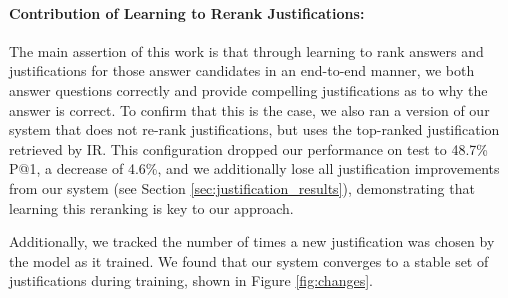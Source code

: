 \paragraph{Contribution of Learning to Rerank Justifications:}
The main assertion of this work is that through learning to rank answers and justifications for those answer candidates in an end-to-end manner, we both answer questions correctly and provide compelling justifications as to why the answer is correct.  To confirm that this is the case, we also ran a version of our system that does not re-rank justifications, but uses the top-ranked justification retrieved by IR.  This configuration dropped our performance on test to 48.7\% P@1, a decrease of 4.6\%, and we additionally lose all justification improvements from our system (see Section \ref{sec:justification_results}), demonstrating that learning this reranking is key to our approach.

Additionally, we tracked the number of times a new justification was chosen by the model as it trained. We found that our system converges to a stable set of justifications during training, shown in Figure \ref{fig:changes}.







